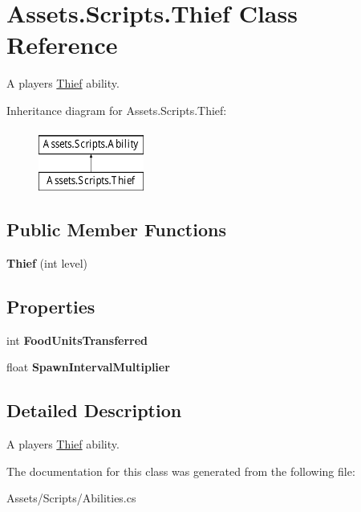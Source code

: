 \hypertarget{class_assets_1_1_scripts_1_1_thief}{}\section{Assets.\+Scripts.\+Thief Class Reference}
\label{class_assets_1_1_scripts_1_1_thief}


A player\textquotesingle{}s \hyperlink{class_assets_1_1_scripts_1_1_thief}{Thief} ability.  


Inheritance diagram for Assets.\+Scripts.\+Thief\+:\begin{figure}[H]
\begin{center}
\leavevmode
\includegraphics[height=2.000000cm]{class_assets_1_1_scripts_1_1_thief}
\end{center}
\end{figure}
\subsection*{Public Member Functions}
\begin{DoxyCompactItemize}
\item 
{\bfseries Thief} (int level)\hypertarget{class_assets_1_1_scripts_1_1_thief_af58aedeb12066309eeb238e538c979b5}{}\label{class_assets_1_1_scripts_1_1_thief_af58aedeb12066309eeb238e538c979b5}

\end{DoxyCompactItemize}
\subsection*{Properties}
\begin{DoxyCompactItemize}
\item 
int {\bfseries Food\+Units\+Transferred}\hypertarget{class_assets_1_1_scripts_1_1_thief_a8c353d536929f9cae47af80041b9ca13}{}\label{class_assets_1_1_scripts_1_1_thief_a8c353d536929f9cae47af80041b9ca13}

\item 
float {\bfseries Spawn\+Interval\+Multiplier}\hypertarget{class_assets_1_1_scripts_1_1_thief_a2075f9337ee6d2ad772768e5e0c65895}{}\label{class_assets_1_1_scripts_1_1_thief_a2075f9337ee6d2ad772768e5e0c65895}

\end{DoxyCompactItemize}


\subsection{Detailed Description}
A player\textquotesingle{}s \hyperlink{class_assets_1_1_scripts_1_1_thief}{Thief} ability. 



The documentation for this class was generated from the following file\+:\begin{DoxyCompactItemize}
\item 
Assets/\+Scripts/Abilities.\+cs\end{DoxyCompactItemize}
